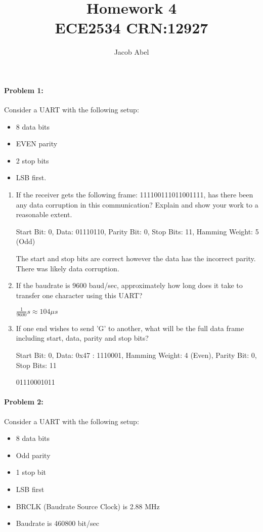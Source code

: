 \documentclass[12pt,letterpaper,titlepage]{article}
\author{Jacob Abel}
\title{	Homework 4
	\\\large ECE2534 CRN:12927
}
\begin{document}
\maketitle

\begin{raggedright}

\paragraph{Problem 1: } 
Consider a UART with the following setup: 
\begin{itemize}[noitemsep]
\item 8 data bits
\item EVEN parity
\item 2 stop bits
\item LSB first.
\end{itemize}

\begin{enumerate}[label=\alph*)]
\item If the receiver gets the following frame: 111100111011001111, has there been any data corruption in this communication? Explain and show your work to a reasonable extent.

Start Bit: 0, Data: 01110110, Parity Bit: 0, Stop Bits: 11, Hamming Weight: 5 (Odd)

The start and stop bits are correct however the data has the incorrect parity. There was likely data corruption.

\item If the baudrate is 9600 baud/sec, approximately how long does it take to transfer one character using this UART?

$\frac{1}{9600}s\approx 104\mu s$

\item If one end wishes to send 'G' to another, what will be the full data frame including start, data, parity and stop bits?

Start Bit: 0, Data: 0x47 : 1110001, Hamming Weight: 4 (Even), Parity Bit: 0, Stop Bits: 11

01110001011

\end{enumerate}

\clearpage
\paragraph{Problem 2: } 
Consider a UART with the following setup: 
\begin{itemize}[noitemsep]
\item 8 data bits
\item Odd parity
\item 1 stop bit
\item LSB first
\item BRCLK (Baudrate Source Clock) is 2.88 MHz
\item Baudrate is 460800 bit/sec
\end{itemize}


\end{raggedright}
\end{document}
